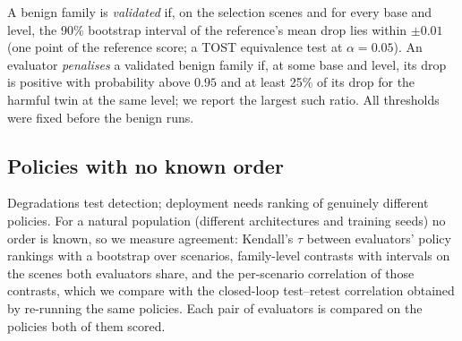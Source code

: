 A benign family is \emph{validated} if, on the selection scenes and for every base and level, the 90\%
bootstrap interval of the reference's mean drop lies within $\pm0.01$ (one point of the reference
score; a TOST equivalence test at $\alpha=0.05$).
An evaluator \emph{penalises} a validated benign family if, at some base and level, its drop is
positive with probability above $0.95$ and at least 25\% of its drop for the harmful twin at the same
level; we report the largest such ratio.
All thresholds were fixed before the benign runs.

\subsection{Policies with no known order}
\label{sec:method:popB}
Degradations test detection; deployment needs ranking of genuinely different policies.
For a natural population (different architectures and training seeds) no order is known, so we
measure agreement: Kendall's $\tau$ between evaluators' policy rankings with a bootstrap over
scenarios, family-level contrasts with intervals on the scenes both evaluators share, and the
per-scenario correlation of those contrasts, which we compare with the closed-loop test--retest
correlation obtained by re-running the same policies.
Each pair of evaluators is compared on the policies both of them scored.
